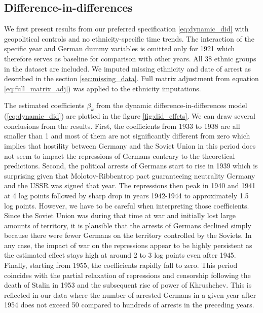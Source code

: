\subsection{Difference-in-differences}
We first present results from our preferred specification \ref{eq:dynamic_did} with geopolitical controls and no ethnicity-specific time trends. 
The interaction of the specific year and German dummy variables is omitted only for 1921 which therefore serves as baseline for comparison with other years. 
All 38 ethnic groups in the dataset are included. 
We imputed missing ethnicity and date of arrest as described in the section \ref{sec:missing_data}.  Full matrix adjustment from equation \ref{eq:full_matrix_adj}) was applied to the ethnicity imputations. 

 The estimated coefficients  $\beta_k$ from the dynamic difference-in-differences model (\ref{eq:dynamic_did}) are plotted in the figure \ref{fig:did_effets}.
 We can draw several conclusions from the results. 
 First, the coefficients from 1933 to 1938 are all smaller than 1 and most of them are not significantly different from zero which implies that hostility between Germany and the Soviet Union in this period does not seem to impact the repressions of Germans contrary to the theoretical predictions. Second, the political arrests of Germans start to rise in 1939 which is surprising given that  Molotov-Ribbentrop pact guaranteeing neutrality Germany and the USSR was signed that year. The repressions then peak  in 1940 and 1941  at 4 log points
  followed by sharp drop in years 1942-1944 to approximately 1.5 log points. 
  However,  we have to be careful when interpreting those coefficients. 
 Since the Soviet Union was during that time at war and initially lost large amounts of territory, it is plausible that the arrests of Germans  declined simply because there were fewer Germans on the territory controlled by the Soviets. 
 In any case,  the impact of war on the repressions appear to be highly persistent as 
  the estimated effect stays high at around 2 to 3 log points even after 1945.
Finally,  starting from 1955, the coefficients rapidly fall to zero. 
This period coincides with the partial relaxation of repressions and censorship following the death of Stalin in 1953 and the subsequent  rise of power of Khrushchev. 
This is reflected in our data where the number of arrested Germans in a given year after 1954 does not exceed 50 compared to hundreds of arrests in the preceding years. 


